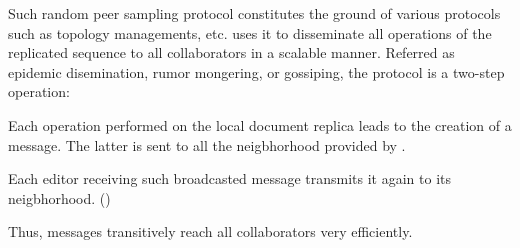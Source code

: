Such random peer sampling protocol constitutes the ground of various protocols
such as topology managements,  etc. \CRATE uses it to disseminate all
operations of the replicated sequence to all collaborators in a scalable
manner. Referred as epidemic disemination, rumor mongering, or gossiping, the
protocol is a two-step operation:
\begin{inparaenum}[(i)]
\item Each operation performed on the local document replica leads to the
  creation of a message. The latter is sent to all the neigbhorhood provided by
  \SPRAY.
\item Each editor receiving such broadcasted message transmits it again to its
  neigbhorhood. ()
\end{inparaenum}
Thus, messages transitively reach all collaborators very efficiently.

